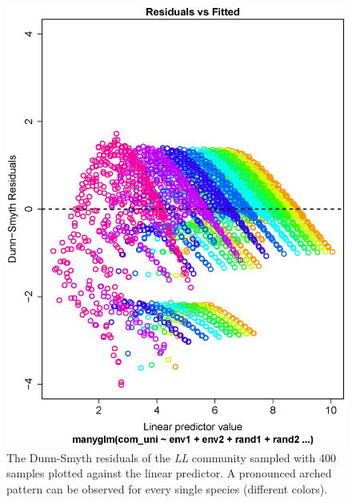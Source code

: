 \documentclass[a4paper,11pt]{article}
\begin{document}
    \begin{figure}[!htbp]
        \centering
        \includegraphics[scale = 0.4]{figure5_arched_dunn_smyth}
        \caption{
        The Dunn-Smyth residuals of the \textit{LL} community sampled with 400 samples plotted against the linear predictor. A pronounced arched pattern can be observed for every single species (different colors).
        }
        \label{fig:arched_DS}
    \end{figure}{}
    
  
    
\end{document}
